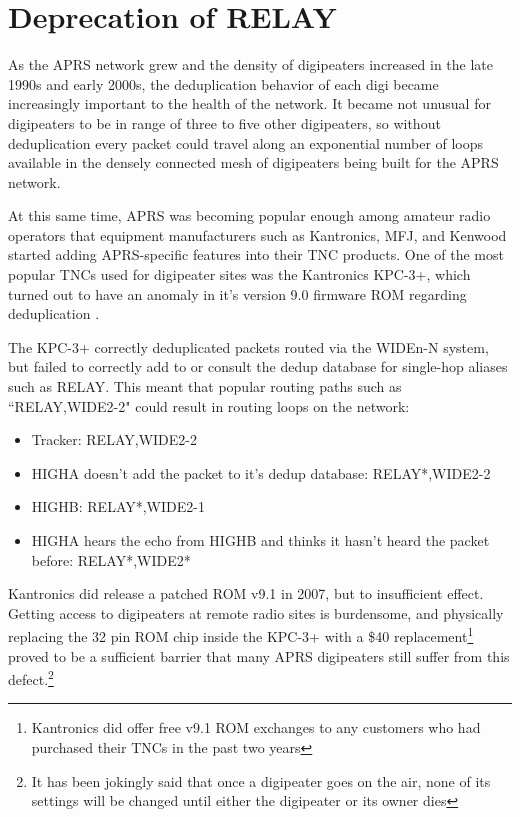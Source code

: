 \section{Deprecation of RELAY}

As the APRS network grew and the density of digipeaters increased in the late 1990s and early 2000s,
the deduplication behavior of each digi became increasingly important to the health of the network.
It became not unusual for digipeaters to be in range of three to five other digipeaters,
so without deduplication every packet could travel along an exponential number of
loops available in the densely connected mesh of digipeaters being built for the APRS network.

At this same time, APRS was becoming popular enough among amateur radio operators that
equipment manufacturers such as Kantronics, MFJ, and Kenwood started adding APRS-specific features
into their TNC products.
One of the most popular TNCs used for digipeater sites was the Kantronics KPC-3+,
which turned out to have an anomaly in it's 
version 9.0 firmware ROM regarding deduplication \cite{kpc3bugbulletin}.

The KPC-3+ correctly deduplicated packets routed via the WIDEn-N system,
but failed to correctly add to or consult the dedup database for single-hop
aliases such as RELAY.
This meant that popular routing paths such as ``RELAY,WIDE2-2" could result in
routing loops on the network:

\begin{itemize}
	\item Tracker: RELAY,WIDE2-2
	\item HIGHA doesn't add the packet to it's dedup database: RELAY*,WIDE2-2 
	\item HIGHB: RELAY*,WIDE2-1
	\item HIGHA hears the echo from HIGHB and thinks it hasn't heard the packet before: RELAY*,WIDE2*
\end{itemize}

Kantronics did release a patched ROM v9.1 in 2007, but to insufficient effect.
Getting access to digipeaters at remote radio sites is burdensome,
and physically replacing the 32 pin ROM chip inside the KPC-3+ 
with a \$40 replacement\footnote{Kantronics did offer free v9.1 ROM exchanges to 
any customers who had purchased their TNCs in the past two years} 
proved to be a sufficient barrier that many APRS digipeaters still
suffer from this defect.\footnote{It has been jokingly said that once a digipeater
	goes on the air, none of its settings will be changed until either the digipeater
or its owner dies}

